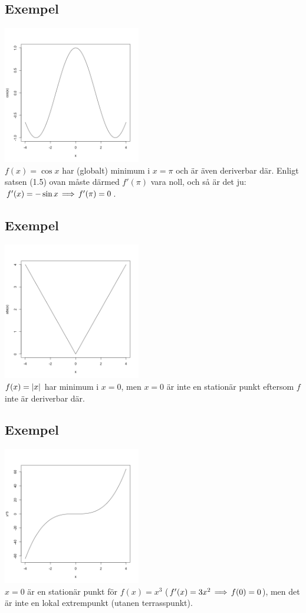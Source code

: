 \documentclass{article}
\begin{document}
\subsection{Exempel}
\includegraphics[height=60mm, width=60mm]{img/cos.png}\\
$f(x) = \cos x$ har (globalt) minimum i $x=\pi$ och är även deriverbar där. Enligt satsen (1.5) ovan måste
därmed $f'(\pi)$ vara noll, och så är det ju: $f'(x)=-\sin x \operatorname{\implies} f'(\pi) = 0$.

\subsection{Exempel}
\includegraphics[height=60mm, width=60mm]{img/abs.png}\\
$f(x)=\lvert x\rvert$ har minimum i $x=0$, men $x=0$ är inte en stationär punkt eftersom $f$ inte är deriverbar där.

\subsection{Exempel}
\includegraphics[height=60mm, width=60mm]{img/x3.png}\\
$x=0$ är en stationär punkt för $f(x)=x^3$ ($f'(x)=3x^2\operatorname{\implies} f(0)=0$),
men det är inte en lokal extrempunkt (utanen terrasspunkt).
\end{document}
